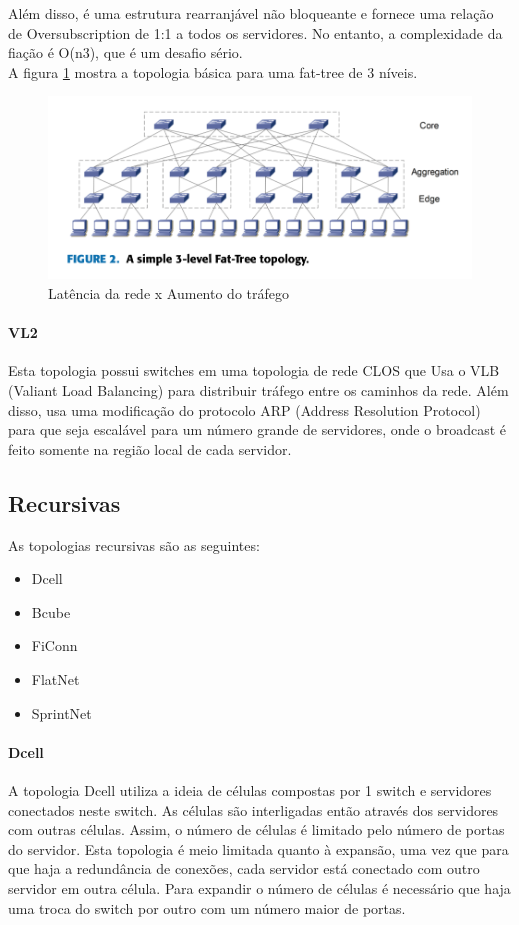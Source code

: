 \documentclass[12pt,a4paper]{report}
\begin{document}
Além disso, é uma estrutura rearranjável não bloqueante e fornece uma relação de Oversubscription de 1:1 a todos os servidores. No entanto, a complexidade da fiação é O(n3), que é um desafio sério.\\

A figura \ref{fat_tree} mostra a topologia básica para uma fat-tree de 3 níveis.\\

\begin{figure}[H]
\centering
\includegraphics[width=.8\textwidth]{imagens/fat_tree.png}
\caption{Latência da rede x Aumento do tráfego}
\label{fat_tree}
\end{figure}

\paragraph{VL2}
Esta topologia possui switches em uma topologia de rede CLOS que Usa o VLB (Valiant Load Balancing) para distribuir tráfego entre os caminhos da rede. Além disso, usa uma modificação do protocolo ARP (Address Resolution Protocol) para que seja escalável para um número grande de servidores, onde o broadcast é feito somente na região local de cada servidor.\\

\subsection{Recursivas}
As topologias recursivas são as seguintes:\\
\begin{itemize}
\item Dcell
\item Bcube
\item FiConn
\item FlatNet
\item SprintNet
\end{itemize}

\paragraph{Dcell}
A topologia Dcell utiliza a ideia de células compostas por 1 switch e servidores conectados neste switch. As células são interligadas então através dos servidores com outras células. Assim, o número de células é limitado pelo número de portas do servidor. Esta topologia é meio limitada quanto à expansão, uma vez que para que haja a redundância de conexões, cada servidor está conectado com outro servidor em outra célula. Para expandir o número de células é necessário que haja uma troca do switch por outro com um número maior de portas.\\
\end{document}
